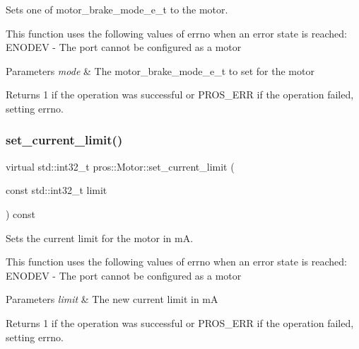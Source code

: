 Sets one of motor\+\_\+brake\+\_\+mode\+\_\+e\+\_\+t to the motor.

This function uses the following values of errno when an error state is reached\+: E\+N\+O\+D\+EV -\/ The port cannot be configured as a motor


\begin{DoxyParams}{Parameters}
{\em mode} & The motor\+\_\+brake\+\_\+mode\+\_\+e\+\_\+t to set for the motor\\
\hline
\end{DoxyParams}
\begin{DoxyReturn}{Returns}
1 if the operation was successful or P\+R\+O\+S\+\_\+\+E\+RR if the operation failed, setting errno. 
\end{DoxyReturn}
\mbox{\label{classpros_1_1Motor_a4c496dfb0b33f989d7329a61b7b6d6ba}} 
\subsubsection{\texorpdfstring{set\+\_\+current\+\_\+limit()}{set\_current\_limit()}}
{\footnotesize\ttfamily virtual std\+::int32\+\_\+t pros\+::\+Motor\+::set\+\_\+current\+\_\+limit (\begin{DoxyParamCaption}\item[{const std\+::int32\+\_\+t}]{limit }\end{DoxyParamCaption}) const\hspace{0.3cm}{\ttfamily [virtual]}}

Sets the current limit for the motor in mA.

This function uses the following values of errno when an error state is reached\+: E\+N\+O\+D\+EV -\/ The port cannot be configured as a motor


\begin{DoxyParams}{Parameters}
{\em limit} & The new current limit in mA\\
\hline
\end{DoxyParams}
\begin{DoxyReturn}{Returns}
1 if the operation was successful or P\+R\+O\+S\+\_\+\+E\+RR if the operation failed, setting errno. 
\end{DoxyReturn}
\mbox{\label{classpros_1_1Motor_a2d2fea8d5967d1e41471111aa89afd84}} 
